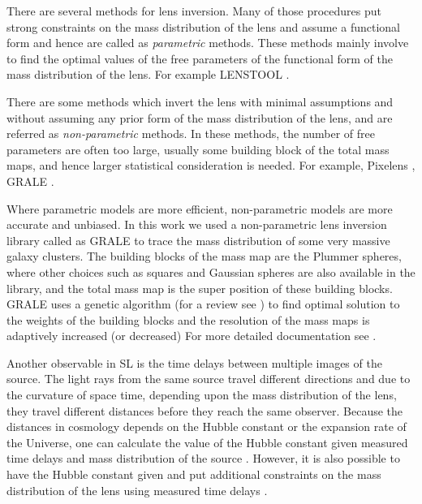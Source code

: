 There are 
several methods for lens inversion. Many of those procedures put strong constraints
on the mass distribution of the lens and assume a functional form and hence are called
as {\it parametric} methods. These methods mainly involve to find the optimal values 
of the free parameters of the functional form of the mass distribution of the lens. 
For example LENSTOOL \cite{2011ascl.soft02004K}.

There are some methods which invert the lens with minimal assumptions and without
assuming any prior form of the mass distribution of the lens, and are referred as
{\it non-parametric} methods. In these methods, the number of free parameters are often
too large, usually some building block of the total mass maps, and hence larger
statistical consideration is needed. For example, Pixelens \cite{2011ascl.soft02007S}, 
GRALE \cite{2006MNRAS.367.1209L}.

Where parametric models are more efficient, non-parametric models are more
accurate and unbiased. In this work we used a non-parametric lens inversion
library called as GRALE \cite{2006MNRAS.367.1209L,2007MNRAS.380.1729L,2009MNRAS.397..341L} 
to trace the mass distribution of some very massive
galaxy clusters. The building blocks of the mass map are the Plummer spheres, where
other choices such as squares and Gaussian spheres are also available in the library, 
and the total mass map is the super position of these building blocks. GRALE uses
a genetic algorithm (for a review see \citep{1995ApJS..101..309C}) 
to find optimal solution to the weights of the building 
blocks and the resolution of the mass maps is adaptively increased (or decreased)
For more detailed documentation see \cite{2009MNRAS.397..341L}.

Another observable in SL is the time delays between multiple images
of the source. The light rays from the same source travel different directions
and due to the curvature of space time, depending upon the mass distribution 
of the lens, they travel different distances before they reach the same 
observer. Because the distances in cosmology depends on the Hubble constant
or the expansion rate of the Universe, one can calculate the value of the
Hubble constant given measured time delays and mass distribution of the source
\cite{2004tomu.conf..231R}. 
However, it is also possible to have the Hubble constant given and put
additional constraints on the mass distribution of the lens using measured
time delays \cite{2015PASJ...67...21M}.


